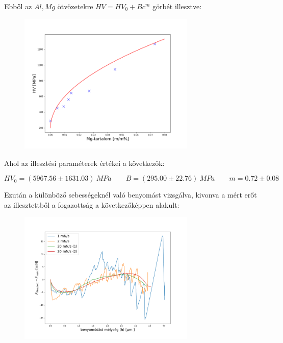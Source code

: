 \documentclass[a4paper,12pt]{article}
\begin{document}
\par Ebből az $Al, Mg$ ötvözetekre $HV = HV_{0} + Bc^{m}$ görbét illesztve:

\begin{figure}[H]
\centering
\includegraphics[width=0.75\textwidth]{./adatok/HV_illeszt.png}
\end{figure}

\par Ahol az illesztési paraméterek értékei a következők:

\begin{equation*}
HV_{0} = (5967.56 \pm 1631.03) ~MPa \quad \quad
B = (295.00\pm22.76)~MPa \quad \quad
m = 0.72\pm0.08
\end{equation*}

\par Ezután a különböző sebességeknél való benyomást vizsgálva, kivonva a mért erőt az illesztettből a fogazottság a következőképpen alakult:

\begin{figure}[H]
\centering
\includegraphics[width=0.75\textwidth]{./adatok/feladat3.png}
\end{figure}
\end{document}
